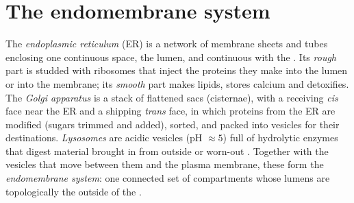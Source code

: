 \section{The endomembrane system}

\begin{definition}\label{def:b1:eukaryotic-cell:endomembrane}
The \emph{endoplasmic reticulum} (ER) is
a network of membrane sheets and tubes enclosing one continuous space,
the lumen, and continuous with the . Its
\emph{rough} part is studded with
ribosomes that inject the proteins they make into the lumen or into the
membrane; its \emph{smooth} part
makes lipids, stores calcium and detoxifies. The \emph{Golgi
apparatus} is a stack of flattened sacs
(cisternae), with a receiving \emph{cis} face near the ER and a
shipping \emph{trans} face, in which proteins from the ER are modified
(sugars trimmed and added), sorted, and packed into vesicles for their
destinations. \emph{Lysosomes} are acidic vesicles (pH
$\approx 5$) full of hydrolytic enzymes that digest material brought in
from outside or worn-out . Together with the vesicles that
move between them and the plasma membrane, these form the
\emph{endomembrane system}: one connected set
of compartments whose lumens are topologically the outside of the .
\end{definition}

